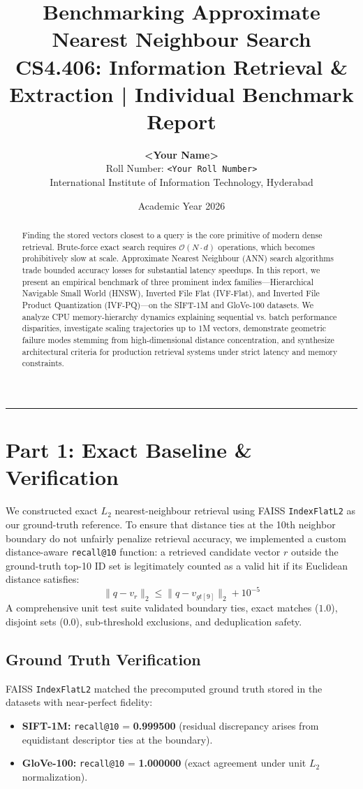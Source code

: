 \documentclass[11pt,a4paper]{article}
\title{\textbf{Benchmarking Approximate Nearest Neighbour Search}\\
\large CS4.406: Information Retrieval \& Extraction | Individual Benchmark Report}
\author{
    \textbf{<Your Name>} \\[1mm]
    Roll Number: \texttt{<Your Roll Number>} \\[1mm]
    International Institute of Information Technology, Hyderabad
}
\date{Academic Year 2026}
\begin{document}
\vspace{-8mm}\maketitle\vspace{-4mm}

\begin{abstract}
Finding the stored vectors closest to a query is the core primitive of modern dense retrieval. Brute-force exact search requires $\mathcal{O}(N \cdot d)$ operations, which becomes prohibitively slow at scale. Approximate Nearest Neighbour (ANN) search algorithms trade bounded accuracy losses for substantial latency speedups. In this report, we present an empirical benchmark of three prominent index families---Hierarchical Navigable Small World (HNSW), Inverted File Flat (IVF-Flat), and Inverted File Product Quantization (IVF-PQ)---on the SIFT-1M and GloVe-100 datasets. We analyze CPU memory-hierarchy dynamics explaining sequential vs. batch performance disparities, investigate scaling trajectories up to 1M vectors, demonstrate geometric failure modes stemming from high-dimensional distance concentration, and synthesize architectural criteria for production retrieval systems under strict latency and memory constraints.
\end{abstract}

\vspace{2mm}
\hrule
\vspace{4mm}

\section{Part 1: Exact Baseline \& Verification}
We constructed exact $L_2$ nearest-neighbour retrieval using FAISS \texttt{IndexFlatL2} as our ground-truth reference. To ensure that distance ties at the 10th neighbor boundary do not unfairly penalize retrieval accuracy, we implemented a custom distance-aware \texttt{recall@10} function: a retrieved candidate vector $r$ outside the ground-truth top-10 ID set is legitimately counted as a valid hit if its Euclidean distance satisfies:
\begin{equation}
\|q - v_r\|_2 \le \|q - v_{gt[9]}\|_2 + 10^{-5}
\end{equation}
A comprehensive unit test suite validated boundary ties, exact matches ($1.0$), disjoint sets ($0.0$), sub-threshold exclusions, and deduplication safety.

\subsection{Ground Truth Verification}
FAISS \texttt{IndexFlatL2} matched the precomputed ground truth stored in the datasets with near-perfect fidelity:
\begin{itemize}
    \item \textbf{SIFT-1M:} \texttt{recall@10} = \textbf{0.999500} (residual discrepancy arises from equidistant descriptor ties at the boundary).
    \item \textbf{GloVe-100:} \texttt{recall@10} = \textbf{1.000000} (exact agreement under unit $L_2$ normalization).
\end{itemize}
\end{document}
